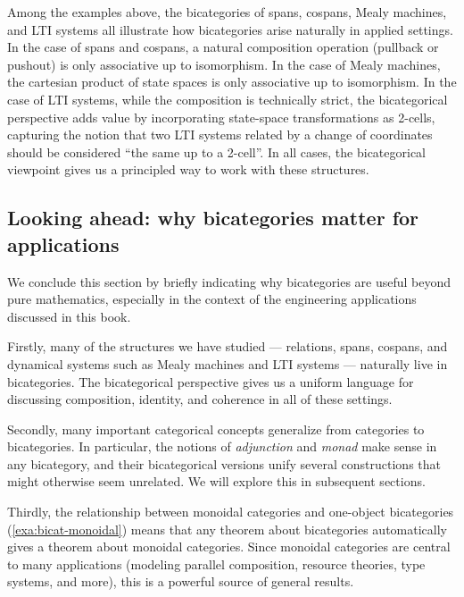 \begin{remark}
    Among the examples above, the bicategories of spans, cospans, Mealy machines, and LTI systems all illustrate how bicategories arise naturally in applied settings.
    In the case of spans and cospans, a natural composition operation (pullback or pushout) is only associative up to isomorphism.
    In the case of Mealy machines, the cartesian product of state spaces is only associative up to isomorphism.
    In the case of LTI systems, while the composition is technically strict, the bicategorical perspective adds value by incorporating state-space transformations as 2-cells, capturing the notion that two LTI systems related by a change of coordinates should be considered ``the same up to a 2-cell''.
    In all cases, the bicategorical viewpoint gives us a principled way to work with these structures.
\end{remark}

\subsection{Looking ahead: why bicategories matter for applications}
\label{sec:bicat-motivation-applications}

We conclude this section by briefly indicating why bicategories are useful beyond pure mathematics, especially in the context of the engineering applications discussed in this book.

Firstly, many of the structures we have studied --- relations, spans, cospans, and dynamical systems such as Mealy machines and LTI systems --- naturally live in bicategories.
The bicategorical perspective gives us a uniform language for discussing composition, identity, and coherence in all of these settings.

Secondly, many important categorical concepts generalize from categories to bicategories.
In particular, the notions of \emph{adjunction} and \emph{monad} make sense in any bicategory, and their bicategorical versions unify several constructions that might otherwise seem unrelated.
We will explore this in subsequent sections.

Thirdly, the relationship between monoidal categories and one-object bicategories (\cref{exa:bicat-monoidal}) means that any theorem about bicategories automatically gives a theorem about monoidal categories.
Since monoidal categories are central to many applications (modeling parallel composition, resource theories, type systems, and more), this is a powerful source of general results.